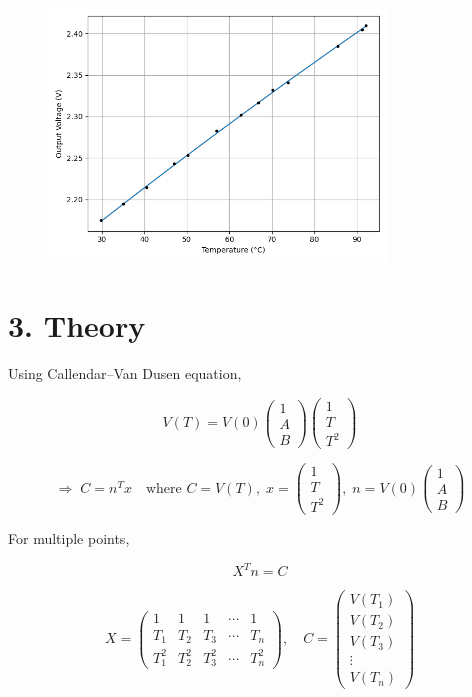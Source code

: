 \documentclass[12pt,a4paper]{article}
\begin{document}
\begin{figure}[h!]
    \centering
    \includegraphics[width=0.8\textwidth]{../figs/valid.png}
\end{figure}

\newpage 

\section*{3. Theory}

Using Callendar–Van Dusen equation,

\[
V(T) = V(0) \begin{pmatrix}1 \\[4pt] A \\[4pt] B \end{pmatrix}
\begin{pmatrix}1 \\[4pt] T \\[4pt] T^2 \end{pmatrix}
\]

\[
\Rightarrow \; C = n^{T}x \quad \text{where } C = V(T), \;
x = \begin{pmatrix}1 \\[4pt] T \\[4pt] T^2 \end{pmatrix}, \;
n = V(0)\begin{pmatrix}1 \\[4pt] A \\[4pt] B \end{pmatrix}
\]

For multiple points,

\[
X^{T}n = C
\]

\[
X =
\begin{pmatrix}
1 & 1 & 1 & \cdots & 1\\
T_1 & T_2 & T_3 & \cdots & T_n\\
T_1^2 & T_2^2 & T_3^2 & \cdots & T_n^2
\end{pmatrix},
\quad
C =
\begin{pmatrix}
V(T_1)\\[4pt]
V(T_2)\\[4pt]
V(T_3)\\[4pt]
\vdots\\[4pt]
V(T_n)
\end{pmatrix}
\]
\end{document}
